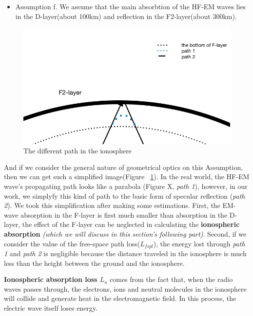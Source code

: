 \documentclass{mcmthesis}
\begin{document}
    \begin{itemize}
      \item Assumption f. We assume that the main absorbtion of the HF-EM waves lies in the D-layer(about 100km) and reflection in the F2-layer(about 300km).
    \end{itemize}

    \begin{figure}[h]
    \centering
    \includegraphics[scale=0.5]{PathinIonosphere}
    \caption{The different path in the ionosphere}
    \label{fig:PathinIonosphere}
    \end{figure}

    And if we consider the general nature of geometrical optics on this Assumption, then we can get such a simplified image(Figure ~\ref{fig:PathinIonosphere}). In the real world, the HF-EM wave's propagating path looks like a parabola (Figure X, \emph{path 1}), however, in our work, we simplyfy this kind of path to the basic form of specular reflection (\emph{path 2}). We took this simplification after making some estimations. First, the EM-wave absorption in the F-layer is first much smaller than absorption in the D-layer, the effect of the F-layer can be neglected in calculating the \textbf{ionospheric absorption} \emph{(which we will discuss in this section's following part)}. Second, if we consider the value of the free-space path loss($L_{fspl}$), the energy lost through \emph{path 1} and \emph{path 2} is negligible because the distance traveled in the ionosphere is much less than the height between the ground and the ionosphere.

    \textbf{Ionospheric absorption loss $L_{a}$} comes from the fact that, when the radio waves passes through, the electrons, ions and neutral molecules in the ionosphere will collide and generate heat in the electromagnetic field. In this process, the electric wave itself loses energy.
\end{document}
